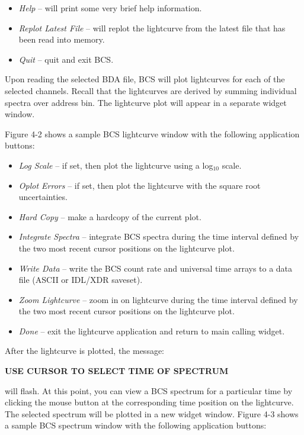 {{{\begin{itemize}
\item{\it Help} -- will print some very brief help information.

\item{\it Replot Latest File} -- will replot the lightcurve from
the latest file that has been read into memory.

\item{\it Quit} -- quit and exit BCS.

\end{itemize}
Upon reading the selected BDA file, BCS will plot
lightcurves for each of the selected channels. Recall that the
lightcurves are derived by summing individual spectra over address bin.
The lightcurve plot will appear in a separate widget window.

Figure 4-2 shows a sample BCS lightcurve window with the following application
buttons:
\begin{itemize}

\item{\it Log Scale} -- if set, then plot the lightcurve using a
log$_{10}$ scale. \

\item{\it Oplot Errors} -- if set, then plot the lightcurve with the square root
uncertainties.

\item{\it Hard Copy} -- make a hardcopy of the current plot.

\item{\it Integrate Spectra} -- integrate BCS
spectra during the time interval defined by the two
most recent cursor positions on the lightcurve plot.

\item{\it Write Data} -- write the BCS count rate and universal time arrays
to a data file (ASCII or IDL/XDR saveset).

\item{\it Zoom Lightcurve} -- zoom in on lightcurve
during the time interval defined by the two
most recent cursor positions on the lightcurve plot.

\item{\it Done} -- exit the lightcurve application and return to main calling widget.

\end{itemize}
After the lightcurve is plotted, the message:
\newline
\newline
\centerline{\bf USE CURSOR TO SELECT TIME OF SPECTRUM}
\newline
\newline
will flash. At this point, you can view a BCS spectrum for a
particular time by clicking the mouse button at the corresponding time position
on the lightcurve. The selected spectrum will be plotted
in a new widget window.
Figure 4-3 shows a sample BCS spectrum window with
the following application buttons:
\begin{itemize}


\end{itemize}}}}
